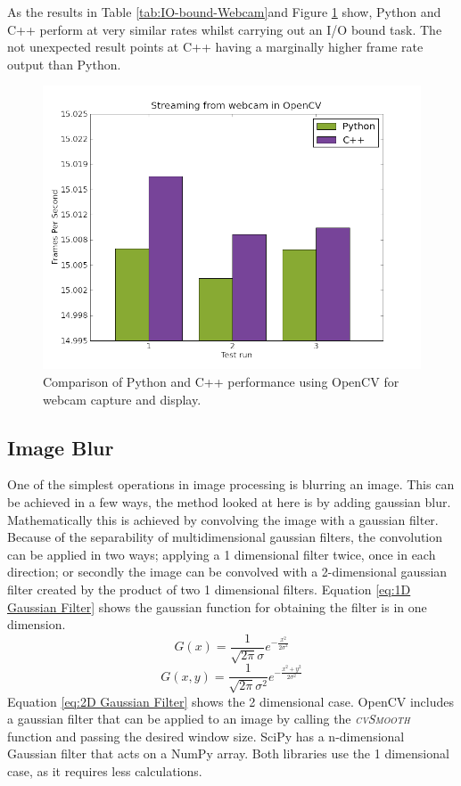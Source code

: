 \documentclass[english]{IEEEtran}
\newcommand{\noun}[1]{\textsc{#1}}
\theoremstyle{plain}
\begin{document}
As the results in Table \ref{tab:IO-bound-Webcam}and Figure \ref{fig:Streaming-comparison}
show, Python and C++ perform at very similar rates whilst carrying
out an I/O bound task. The not unexpected result points at C++ having
a marginally higher frame rate output than Python. 

%
\begin{figure}[h]
\centering{}\includegraphics[width=0.8\columnwidth]{report_data/streaming_from_webcam_in_opencv}\caption{\label{fig:Streaming-comparison}Comparison of Python and C++ performance
using OpenCV for webcam capture and display.}

\end{figure}



\subsection{Image Blur}

One of the simplest operations in image processing is blurring an
image. This can be achieved in a few ways, the method looked at here
is by adding gaussian blur. Mathematically this is achieved by convolving
the image with a gaussian filter. Because of the separability of multidimensional
gaussian filters\cite{young1995recursive}, the convolution can be
applied in two ways; applying a 1 dimensional filter twice, once in
each direction; or secondly the image can be convolved with a 2-dimensional
gaussian filter created by the product of two 1 dimensional filters.
Equation \ref{eq:1D Gaussian Filter} shows the gaussian function
for obtaining the filter is in one dimension\cite{SS01}. \begin{equation}
G\left(x\right)=\frac{1}{\sqrt{2\pi}\sigma}e^{-\frac{x^{2}}{2\sigma^{2}}}\label{eq:1D Gaussian Filter}\end{equation}
\begin{equation}
G\left(x,y\right)=\frac{1}{\sqrt{2\pi}\sigma^{2}}e^{-\frac{x^{2}+y^{2}}{2\sigma^{2}}}\label{eq:2D Gaussian Filter}\end{equation}
Equation \ref{eq:2D Gaussian Filter} shows the 2 dimensional case\cite{SS01}.
OpenCV includes a gaussian filter that can be applied to an image
by calling the \emph{\noun{cvSmooth}} function and passing the desired
window size. SciPy has a n-dimensional Gaussian filter that acts on
a NumPy array. Both libraries use the 1 dimensional case, as it requires
less calculations.
\end{document}
